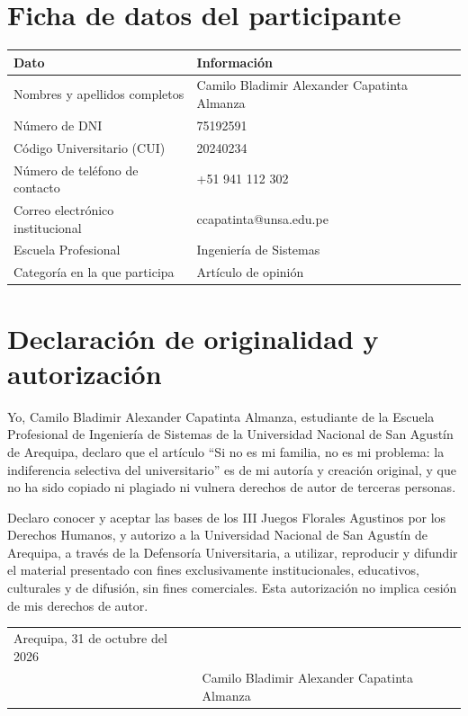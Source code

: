 \documentclass[10pt,a4paper]{article}
\newcommand{\autor}{Camilo Bladimir Alexander Capatinta Almanza}
\begin{document}
\section{Ficha de datos del participante}
\begin{singlespace}
\renewcommand{\arraystretch}{1.8}
\noindent
\begin{tabularx}{\textwidth}{@{}p{5.2cm}X@{}}
  \toprule
  \textbf{Dato} & \textbf{Información} \\
  \midrule
  Nombres y apellidos completos & \autor \\
  Número de DNI & 75192591 \\
  Código Universitario (CUI) & 20240234 \\
  Número de teléfono de contacto & +51 941 112 302 \\
  Correo electrónico institucional & ccapatinta@unsa.edu.pe \\
  Escuela Profesional & Ingeniería de Sistemas \\
  Categoría en la que participa & Artículo de opinión \\
  \bottomrule
\end{tabularx}
\end{singlespace}

\bigskip

\section{Declaración de originalidad y autorización}
\begin{singlespace}
Yo, \autor, estudiante de la Escuela Profesional de Ingeniería de Sistemas de
la Universidad Nacional de San Agustín de Arequipa, declaro que el artículo
\enquote{Si no es mi familia, no es mi problema: la indiferencia selectiva del
universitario} es de mi autoría y creación original, y que no ha sido copiado
ni plagiado ni vulnera derechos de autor de terceras personas.
\vspace{1em}

Declaro conocer y aceptar las bases de los III Juegos Florales Agustinos por
los Derechos Humanos, y autorizo a la Universidad Nacional de San Agustín de
Arequipa, a través de la Defensoría Universitaria, a utilizar, reproducir y
difundir el material presentado con fines exclusivamente institucionales,
educativos, culturales y de difusión, sin fines comerciales. Esta autorización
no implica cesión de mis derechos de autor.

\vspace{3em}
\noindent
\begin{tabular}{@{}p{7cm}p{7cm}@{}}
  Arequipa, 31 de octubre del 2026 & \\
   & \autor \\
\end{tabular}
\end{singlespace}
\end{document}
